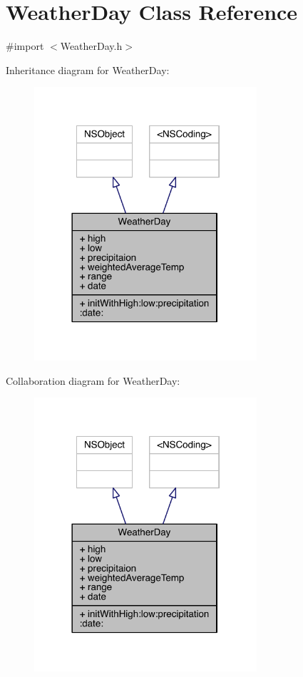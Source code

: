 \hypertarget{interface_weather_day}{\section{Weather\-Day Class Reference}
\label{interface_weather_day}
}


{\ttfamily \#import $<$Weather\-Day.\-h$>$}



Inheritance diagram for Weather\-Day\-:
\nopagebreak
\begin{figure}[H]
\begin{center}
\leavevmode
\includegraphics[width=234pt]{interface_weather_day__inherit__graph}
\end{center}
\end{figure}


Collaboration diagram for Weather\-Day\-:
\nopagebreak
\begin{figure}[H]
\begin{center}
\leavevmode
\includegraphics[width=234pt]{interface_weather_day__coll__graph}
\end{center}
\end{figure}
